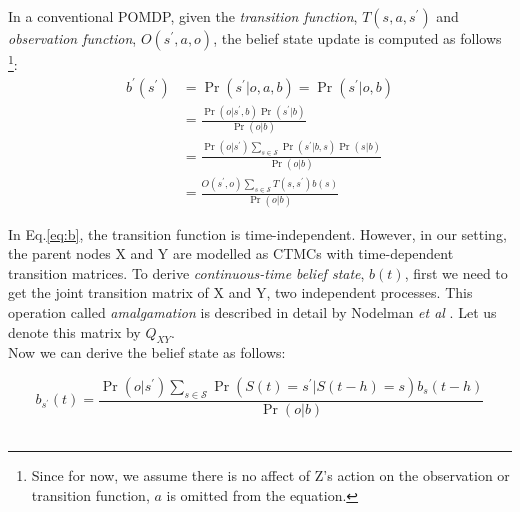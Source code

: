 \documentclass[]{article}
\begin{document}
	In a conventional POMDP, given the \textit{transition function}, $ T(s, a, s^{\prime})$  and \textit{observation function}, $ O(s^{\prime}, a, o) $, the belief state update is computed as follows \cite{Kaelbling2011} \footnote{Since for now, we assume there is no affect of Z's action on the observation or transition function, $ a $ is omitted from the equation.}:
	\begin{equation}
	\begin{aligned}
	b^{\prime}\left(s^{\prime}\right) &=\operatorname{Pr}\left(s^{\prime} | o, a, b\right) =\operatorname{Pr}\left(s^{\prime} | o, b\right) \\
	&=\frac{\operatorname{Pr}\left(o | s^{\prime}, b\right) \operatorname{Pr}\left(s^{\prime} | b\right)}{\operatorname{Pr}(o | b)} \\
	&=\frac{\operatorname{Pr}\left(o | s^{\prime}\right) \sum_{s \in \mathcal{S}} \operatorname{Pr}\left(s^{\prime} | b, s\right) \operatorname{Pr}(s | b)}{\operatorname{Pr}(o | b)} \\
	&=\frac{O\left(s^{\prime}, o\right) \sum_{s \in \mathcal{S}} T\left(s, s^{\prime}\right) b(s)}{\operatorname{Pr}(o | b)}
	\end{aligned}
	\label{eq:b}
	\end{equation}
	
	
	In Eq.\ref{eq:b}, the transition function is time-independent. However, in our setting, the parent nodes X and Y are modelled as CTMCs with time-dependent transition matrices. To derive \textit{continuous-time belief state}, $ b(t) $, first we need to get the joint transition matrix of X and Y, two independent processes. This operation called \textit{amalgamation} is described in detail by Nodelman \textit{et al} \cite{Nodelman1995}. Let us denote this matrix by $ Q_{XY} $. \\
	Now we can derive the belief state as follows: 
	
	\begin{equation}
	b_{s^{\prime}}(t) =\frac{\operatorname{Pr}\left(o |s^{\prime}\right) \sum_{s \in \mathcal{S}} \operatorname{Pr}\left(S(t)=s^{\prime} | S(t-h)=s\right) b_{s}(t-h)}{\operatorname{Pr}(o | b)}
	\end{equation}\\
	
\end{document}
